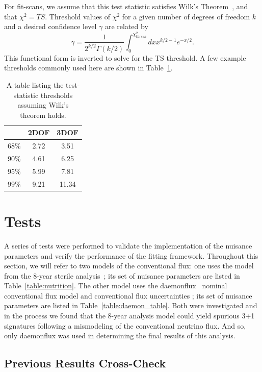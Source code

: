 \documentclass[main.tex]{subfiles}
\begin{document}
For fit-scans, we assume that this test statistic satisfies Wilk's Theorem~\cite{10.1214/aoms/1177732360}, and that $\chi^{2}= TS$. 
Threshold values of $\chi^{2}$ for a given number of degrees of freedom $k$ and a desired confidence level $\gamma$ are related by 
\begin{equation}
    \gamma = \dfrac{1}{2^{k/2} \Gamma(k/2)} \int_{0}^{\chi^{2}_{thresh}} dx x^{k/2 - 1} e^{-x/2}. 
\end{equation}
This functional form is inverted to solve for the TS threshold. A few example thresholds commonly used here are shown in Table~\ref{table:tsthresh}.
\begin{table}
    \centering
    \begin{tabular}{c | c c}\rowcolor{blue!25}
        & 2DOF & 3DOF \\\hline
    68\% & 2.72 & 3.51 \\
    90\% & 4.61 & 6.25 \\ 
    95\% & 5.99 & 7.81 \\
    99\% & 9.21 & 11.34 
    \end{tabular}
    \caption{A table listing the test-statistic thresholds assuming Wilk's theorem holds.}\label{table:tsthresh}
\end{table}

\section{Tests}

A series of tests were performed to validate the implementation of the nuisance parameters and verify the performance of the fitting framework. 
Throughout this section, we will refer to two models of the conventional flux: one uses the model from the 8-year sterile analysis~\cite{Aartsen_2020, Aartsen_2020_prd}; its set of nuisance parameters are listed in Table~\ref{table:nutrition}.
The other model uses the daemonflux~\cite{yanez2023daemonflux} nominal conventional flux model and conventional flux uncertainties ; its set of nuisance parameters are listed in Table~\ref{table:daemon_table}. 
Both were investigated and in the process we found that the 8-year analysis model could yield spurious 3+1 signatures following a mismodeling of the conventional neutrino flux. 
And so, only daemonflux was used in determining the final results of this analysis. 

\subsection{Previous Results Cross-Check}
\end{document}
